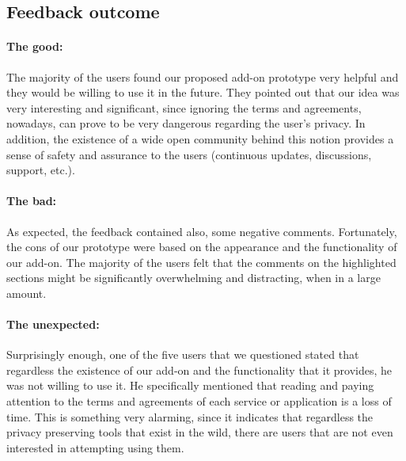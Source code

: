 \subsection{Feedback outcome}

\paragraph{The good: }
The majority of the users found our proposed add-on prototype very helpful and 
they would be willing to use it in the future. They pointed out that our idea 
was very interesting and significant, since ignoring the terms and agreements, 
nowadays, can prove to be very dangerous regarding the user's privacy. In 
addition, the existence of a wide open community behind this notion provides a 
sense of safety and assurance to the users (continuous updates, discussions, 
support, etc.). 
\paragraph{The bad: }
As expected, the feedback contained also, some negative comments. Fortunately, 
the cons of our prototype were based on the appearance and the functionality of 
our add-on. The majority of the users felt that the comments on the highlighted 
sections might be significantly overwhelming and distracting, when in a large 
amount. 
\paragraph{The unexpected: }
Surprisingly enough, one of the five users that we questioned stated that 
regardless the existence of our add-on and the functionality that it provides, 
he was not willing to use it. 
He specifically mentioned that reading and paying attention to the terms and 
agreements of each service or application is a loss of time. This is something 
very alarming, since it indicates that regardless the privacy preserving tools 
that exist in the wild, there are users that are not even interested in 
attempting using them.

